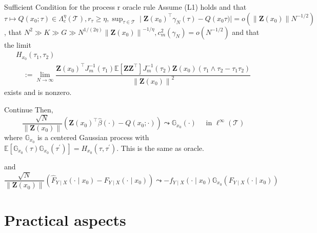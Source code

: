 \documentclass[11pt]{beamer}
\begin{document}
\begin{frame}{Sufficient Condition for the process r oracle rule}
Assume (L1) holds and that $\tau \mapsto Q\left(x_{0} ; \tau\right) \in \Lambda_{c}^{\eta}(\mathcal{T}), r_{\tau} \geq \eta, \sup _{\tau \in \mathcal{T}} \mid \mathbf{Z}\left(x_{0}\right)^{\top} \gamma_{N}(\tau)-Q\left(x_{0}\right.\tau) \mid=o\left(\left\|\mathbf{Z}\left(x_{0}\right)\right\| N^{-1 / 2}\right)$, that $N^2\gg K\gg G \gg N^{1 /(2 \eta)}\left\|\mathbf{Z}\left(x_{0}\right)\right\|^{-1 / \eta}, c_{m}^{2}\left(\gamma_{N}\right)=o(N^{-1/2})$ and that the limit
$$
\begin{array}{l}
H_{x_{0}}\left(\tau_{1}, \tau_{2}\right) \\
\quad:=\lim _{N \rightarrow \infty} \dfrac{\mathbf{Z}\left(x_{0}\right)^{\top} J_{m}^{-1}\left(\tau_{1}\right) \mathbb{E}\left[\mathbf{Z} \mathbf{Z}^{\top}\right] J_{m}^{-1}\left(\tau_{2}\right) \mathbf{Z}\left(x_{0}\right)\left(\tau_{1} \wedge \tau_{2}-\tau_{1} \tau_{2}\right)}{\left\|\mathbf{Z}\left(x_{0}\right)\right\|^{2}}
\end{array}
$$
exists and is nonzero.
\end{frame}
\begin{frame}{Continue}
Then,
$$
\frac{\sqrt{N}}{\left\|\mathbf{Z}\left(x_{0}\right)\right\|}\left(\mathbf{Z}\left(x_{0}\right)^{\top} \widehat{\beta}(\cdot)-Q\left(x_{0} ; \cdot\right)\right) \leadsto \mathbb{G}_{x_{0}}(\cdot) \quad \text { in } \ell^{\infty}(\mathcal{T})
$$
where $\mathbb{G}_{x_{0}}$ is a centered Gaussian process with $\mathbb{E}\left[\mathbb{G}_{x_{0}}(\tau) \mathbb{G}_{x_{0}}\left(\tau^{\prime}\right)\right]=H_{x_{0}}\left(\tau, \tau^{\prime}\right)$. This is the same as oracle.

and
$$
\frac{\sqrt{N}}{\left\|\mathbf{Z}\left(x_{0}\right)\right\|}\left(\widehat{F}_{Y \mid X}\left(\cdot \mid x_{0}\right)-F_{Y \mid X}\left(\cdot \mid x_{0}\right)\right) \leadsto-f_{Y \mid X}\left(\cdot \mid x_{0}\right) \mathbb{G}_{x_{0}}\left(F_{Y \mid X}\left(\cdot \mid x_{0}\right)\right)
$$
\end{frame}

\section{Practical aspects}
\end{document}
